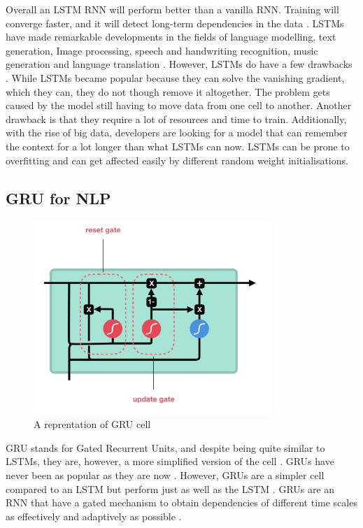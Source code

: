 \documentclass[a4paper,10pt]{article}
\begin{document}
	Overall an LSTM RNN will perform better than a vanilla RNN.  Training will converge faster, and it will detect long-term dependencies in the data \cite{geron2019hands}. LSTMs have made remarkable developments in the fields of language modelling, text generation, Image processing, speech and handwriting recognition, music generation and language translation \cite{g4g}. However, LSTMs do have a few drawbacks \cite{g4g}. While LSTMs became popular because they can solve the vanishing gradient, which they can, they do not though remove it altogether. The problem gets caused by the model still having to move data from one cell to another. Another drawback is that they require a lot of resources and time to train. Additionally, with the rise of big data, developers are looking for a model that can remember the context for a lot longer than what LSTMs can now. LSTMs can be prone to overfitting and can get affected easily by different random weight initialisations.
	
\subsection{GRU for NLP}

	\begin{figure}
		\begin{center}
			\includegraphics[width=9cm]{GRU_example.png}
			\caption{A reprentation of GRU cell \cite{illustrated_lstm_gru}}
			\label{fig:gru_example}
		\end{center}
	\end{figure}

	GRU stands for Gated Recurrent Units, and despite being quite similar to LSTMs, they are, however, a more simplified version of the cell \cite{geron2019hands, grus2019data}. GRUs have never been as popular as they are now \cite{g4g, geron2019hands}. However, GRUs are a simpler cell compared to an LSTM but perform just as well as the LSTM \cite{greff2016lstm}. GRUs are an RNN that have a gated mechanism to obtain dependencies of different time scales as effectively and adaptively as possible \cite{cho2014learning}. 
	
\end{document}
